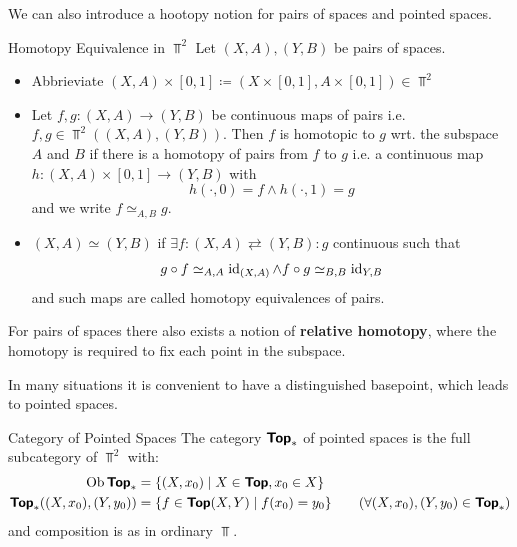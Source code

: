 We can also introduce a hootopy notion for pairs of spaces and pointed spaces.

\begin{definition}{Homotopy Equivalence in $\Top^2$}{}
  Let $(X,A),(Y,B)$ be pairs of spaces. \begin{itemize}
    \item Abbrieviate $(X,A)\times[0,1]\coloneq(X\times[0,1],A\times[0,1])\in\Top^2$
    \item Let $f,g:(X,A)\to(Y,B)$ be continuous maps of pairs i.e. $f,g\in\Top^2((X,A),(Y,B))$. Then $f$ is homotopic to $g$ wrt. the subspace $A$ and $B$ if there is a homotopy of pairs from $f$ to $g$ i.e. a continuous map $h:(X,A)\times[0,1]\to(Y,B)$ with \[
      h(\cdot,0)=f \land h(\cdot,1)=g
    \]
    and we write $f\simeq_{A,B}g$.
    \item $(X,A)\simeq(Y,B)$ if $\exists f:(X,A)\rightleftarrows(Y,B):g$ continuous such that \[
      g\circ f \simeq_{A,A} \operatorname{id}_{(X,A)} \land f\circ g \simeq_{B,B} \operatorname{id}_{Y,B}
    \]
    and such maps are called homotopy equivalences of pairs.
  \end{itemize}
\end{definition}

For pairs of spaces there also exists a notion of \textbf{relative homotopy}, where the homotopy is required to fix each point in the subspace.

In many situations it is convenient to have a distinguished basepoint, which leads to pointed spaces.

\begin{definition}{Category of Pointed Spaces}{}
  The category $\bm{\mathsf{Top}}_*$ of pointed spaces is the full subcategory of $\Top^2$ with: 
  \begin{align*}
    \Ob\Toppt &= \{(X,x_0) \mid X\in\Top, x_0\in X\}\\
    \Toppt((X,x_0),(Y,y_0)) &= \{ f\in \Top(X,Y) \mid f(x_0)=y_0 \} \tag{$\forall (X,x_0),(Y,y_0)\in\Toppt$}
  \end{align*}
  and composition is as in ordinary $\Top$.
\end{definition}


